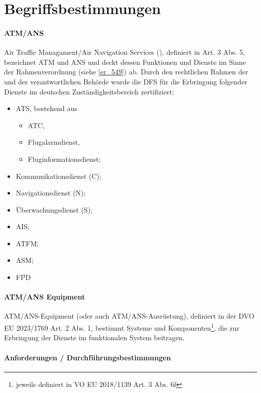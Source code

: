 
\chapter{Begriffsbestimmungen}

\subsubsection{ATM/ANS} \label{beg:atmans}

Air Traffic Managament/Air Navigation Services (\atmans), definiert in  Art. 3 Abs. 5, bezeichnet \acf{ATM} und \acf{ANS} und deckt dessen Funktionen und Dienste im Sinne der Rahmenverordnung (siehe \ref{er_549}) ab.
Durch den rechtlichen Rahmen der  und der verantwortlichen Behörde wurde die DFS für die Erbringung folgender \atmans{} Dienste im deutschen Zuständigkeitsbereich zertifiziert: \cite[17]{ba_technik}
\begin{itemize}
    \item \acf{ATS}, bestehend aus
    \begin{itemize}
        \item \acf{ATC},
        \item Flugalarmdienst,
        \item Fluginformationsdienst;
    \end{itemize}
    \item  Kommunikationsdienst (C);
    \item  Navigationsdienst (N);
    \item  Überwachungsdienst (S);
    \item  \acf{AIS};
    \item  \acf{ATFM};
    \item  \acf{ASM};
    \item  \acf{FPD}
\end{itemize}

\subsubsection{ATM/ANS Equipment}

ATM/ANS-Equipment (oder auch ATM/ANS-Ausrüstung), definiert in der \acf{DVO} \acs{EU} 2023/1769 Art. 2 Abs. 1, bestimmt Systeme und Komponenten\footnote{jeweils definiert in VO EU 2018/1139 Art. 3 Abs. 6f}, die zur Erbringung der Dienste im funktionalen System beitragen.


\subsubsection{Anforderungen / Durchführungsbestimmungen}



